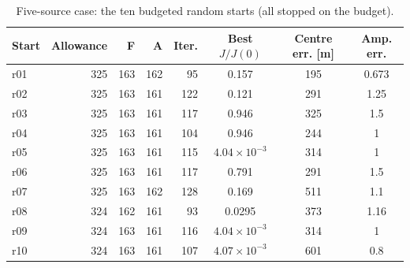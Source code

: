 \begin{table}[htbp]
\centering
\caption{Five-source case: the ten budgeted random starts (all stopped on the budget).}
\label{tab:table_budget_starts}
\footnotesize
\begin{tabular}{lrrrrccc}
\toprule
Start & Allowance & F & A & Iter. & Best $J/J(0)$ & Centre err. [m] & Amp. err. \\
\midrule
r01 & 325 & 163 & 162 & 95 & 0.157 & 195 & 0.673 \\
r02 & 325 & 163 & 161 & 122 & 0.121 & 291 & 1.25 \\
r03 & 325 & 163 & 161 & 117 & 0.946 & 325 & 1.5 \\
r04 & 325 & 163 & 161 & 104 & 0.946 & 244 & 1 \\
r05 & 325 & 163 & 161 & 115 & $4.04\times 10^{-3}$ & 314 & 1 \\
r06 & 325 & 163 & 161 & 117 & 0.791 & 291 & 1.5 \\
r07 & 325 & 163 & 162 & 128 & 0.169 & 511 & 1.1 \\
r08 & 324 & 162 & 161 & 93 & 0.0295 & 373 & 1.16 \\
r09 & 324 & 163 & 161 & 116 & $4.04\times 10^{-3}$ & 314 & 1 \\
r10 & 324 & 163 & 161 & 107 & $4.07\times 10^{-3}$ & 601 & 0.8 \\
\bottomrule
\end{tabular}
\end{table}
